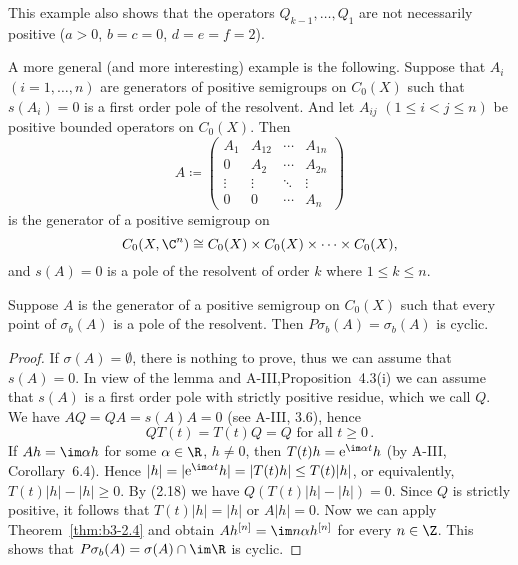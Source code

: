 This example also shows that the operators $Q_{k-1}, \ldots, Q_{1}$ are not necessarily positive (\eg $a>0$, $b=c=0$, $d=e=f=2$).

A more general (and more interesting) example is the following.
Suppose that $A_{i}$ $(i = 1,\ldots,n)$ are generators of positive semigroups on $C_{0}(X)$ such that $s(A_{i}) = 0$ is a first order pole of the resolvent.
And let $A_{ij}$ $(1 \leq i < j \leq n)$ be positive bounded operators on $C_{0}(X)$.
Then
\[
A \coloneqq \begin{pmatrix}
	A_{1} & A_{12} & \cdots & A_{1n} \\
	0 & A_{2} & \cdots & A_{2n} \\
	\vdots & \vdots & \ddots & \vdots \\
	0 & 0 & \cdots & A_{n}
\end{pmatrix}
\]
is the generator of a positive semigroup on 
%
\[
	C_{0}(X,\C^{n}) \cong C_{0}(X) \times C_{0}(X) \times \cdots \times C_{0}(X) , 
\]
%
and $s(A) = 0$ is a pole of the resolvent of order $k$ where $1 \leq k \leq n$.
\begin{theorem}\label{thm:b3-2.9}
Suppose $A$ is the generator of a positive semigroup on $C_{0}(X)$ such that every point of $\sigma_{b}(A)$ is a pole of the resolvent. 
Then $P\sigma_{b}(A) = \sigma_{b}(A)$ is cyclic.
\end{theorem}
%
%	
\begin{proof}
	If $\sigma(A) = \emptyset$, there is nothing to prove, thus we can assume that $s(A) = 0$.
	In view of the lemma and A-III,Proposition~4.3(i) we can assume that $s(A)$ is a first order pole with strictly positive residue, which we call $Q$.
	We have $AQ = QA = s(A)A = 0$ (see A-III, 3.6), hence
	\begin{equation}\label{eq:b3-2.18}
		QT(t) = T(t)Q = Q \text{ for all } t \geq 0\,.
	\end{equation}
	If $Ah = \im\alpha h$ for some $\alpha \in \R$, $h \neq 0$, then $T(t)h = \mathrm{e}^{\im\alpha t}h$ (by A-III, Corollary~6.4).
	Hence $|h| = |\mathrm{e}^{\im\alpha t}h| = |T(t)h| \leq T(t)|h|$, or equivalently, $T(t)|h| - |h| \geq 0$.
	By (2.18) we have $Q(T(t)|h| - |h|) = 0$.
	Since $Q$ is strictly positive, it follows that $T(t)|h| = |h|$ or $A|h| = 0$.
	Now we can apply Theorem~\ref{thm:b3-2.4} and obtain $Ah^{[n]} = \im n\alpha h^{[n]}$ for every $n \in \Z$.
	This shows that $P\sigma_{b}(A) = \sigma(A) \cap \im\R$ is cyclic.
\end{proof}
